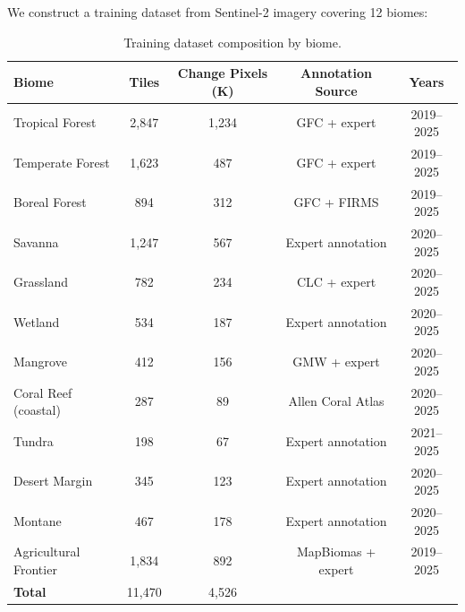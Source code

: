 We construct a training dataset from Sentinel-2 imagery covering 12 biomes:

\begin{table}[H]
\centering
\caption{Training dataset composition by biome.}
\label{tab:training_data}
\begin{tabular}{@{}lcccc@{}}
\toprule
\textbf{Biome} & \textbf{Tiles} & \textbf{Change Pixels (K)} & \textbf{Annotation Source} & \textbf{Years} \\
\midrule
Tropical Forest & 2,847 & 1,234 & GFC + expert & 2019--2025 \\
Temperate Forest & 1,623 & 487 & GFC + expert & 2019--2025 \\
Boreal Forest & 894 & 312 & GFC + FIRMS & 2019--2025 \\
Savanna & 1,247 & 567 & Expert annotation & 2020--2025 \\
Grassland & 782 & 234 & CLC + expert & 2020--2025 \\
Wetland & 534 & 187 & Expert annotation & 2020--2025 \\
Mangrove & 412 & 156 & GMW + expert & 2020--2025 \\
Coral Reef (coastal) & 287 & 89 & Allen Coral Atlas & 2020--2025 \\
Tundra & 198 & 67 & Expert annotation & 2021--2025 \\
Desert Margin & 345 & 123 & Expert annotation & 2020--2025 \\
Montane & 467 & 178 & Expert annotation & 2020--2025 \\
Agricultural Frontier & 1,834 & 892 & MapBiomas + expert & 2019--2025 \\
\midrule
\textbf{Total} & 11,470 & 4,526 & & \\
\bottomrule
\end{tabular}
\end{table}

